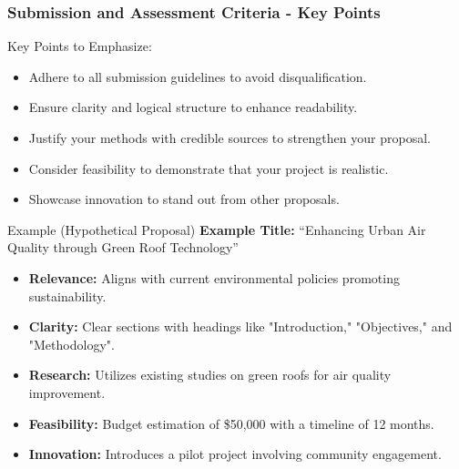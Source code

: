 \documentclass[aspectratio=169]{beamer}
\begin{document}
\begin{frame}[fragile]
\frametitle{Submission and Assessment Criteria - Key Points}
Key Points to Emphasize:

\begin{itemize}
    \item Adhere to all submission guidelines to avoid disqualification.
    \item Ensure clarity and logical structure to enhance readability.
    \item Justify your methods with credible sources to strengthen your proposal.
    \item Consider feasibility to demonstrate that your project is realistic.
    \item Showcase innovation to stand out from other proposals.
\end{itemize}

\begin{block}{Example (Hypothetical Proposal)}
\textbf{Example Title:} “Enhancing Urban Air Quality through Green Roof Technology”

\begin{itemize}
    \item \textbf{Relevance:} Aligns with current environmental policies promoting sustainability.
    \item \textbf{Clarity:} Clear sections with headings like "Introduction," "Objectives," and "Methodology".
    \item \textbf{Research:} Utilizes existing studies on green roofs for air quality improvement.
    \item \textbf{Feasibility:} Budget estimation of \$50,000 with a timeline of 12 months.
    \item \textbf{Innovation:} Introduces a pilot project involving community engagement.
\end{itemize}
\end{block}
\end{frame}
\end{document}
